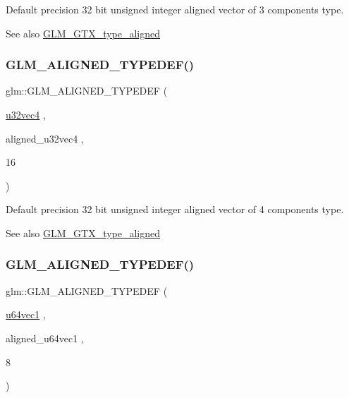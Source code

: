 Default precision 32 bit unsigned integer aligned vector of 3 components type. \begin{DoxySeeAlso}{See also}
\mbox{\hyperlink{group__gtx__type__aligned}{G\+L\+M\+\_\+\+G\+T\+X\+\_\+type\+\_\+aligned}} 
\end{DoxySeeAlso}
\mbox{\label{group__gtx__type__aligned_ga14fd29d01dae7b08a04e9facbcc18824}} 
\subsubsection{\texorpdfstring{GLM\_ALIGNED\_TYPEDEF()}{GLM\_ALIGNED\_TYPEDEF()}\hspace{0.1cm}{\footnotesize\ttfamily [132/209]}}
{\footnotesize\ttfamily glm\+::\+G\+L\+M\+\_\+\+A\+L\+I\+G\+N\+E\+D\+\_\+\+T\+Y\+P\+E\+D\+EF (\begin{DoxyParamCaption}\item[{\mbox{\hyperlink{group__gtc__type__precision_ga6e966cda0025699449a36b41f1787927}{u32vec4}}}]{,  }\item[{aligned\+\_\+u32vec4}]{,  }\item[{16}]{ }\end{DoxyParamCaption})}

Default precision 32 bit unsigned integer aligned vector of 4 components type. \begin{DoxySeeAlso}{See also}
\mbox{\hyperlink{group__gtx__type__aligned}{G\+L\+M\+\_\+\+G\+T\+X\+\_\+type\+\_\+aligned}} 
\end{DoxySeeAlso}
\mbox{\label{group__gtx__type__aligned_gab253845f534a67136f9619843cade903}} 
\subsubsection{\texorpdfstring{GLM\_ALIGNED\_TYPEDEF()}{GLM\_ALIGNED\_TYPEDEF()}\hspace{0.1cm}{\footnotesize\ttfamily [133/209]}}
{\footnotesize\ttfamily glm\+::\+G\+L\+M\+\_\+\+A\+L\+I\+G\+N\+E\+D\+\_\+\+T\+Y\+P\+E\+D\+EF (\begin{DoxyParamCaption}\item[{\mbox{\hyperlink{group__gtc__type__precision_gaf0a59fdb715cf4ddf0c4dabf0e2286a9}{u64vec1}}}]{,  }\item[{aligned\+\_\+u64vec1}]{,  }\item[{8}]{ }\end{DoxyParamCaption})}


